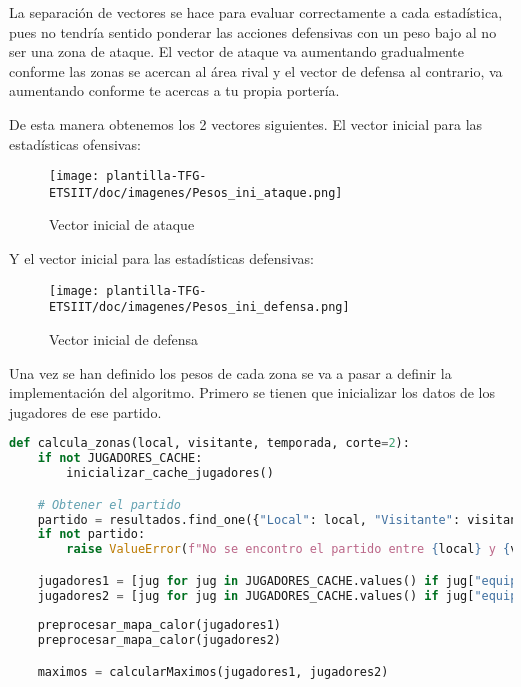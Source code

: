 La separación de vectores se hace para evaluar correctamente a cada estadística, pues no tendría sentido ponderar las acciones defensivas con un peso bajo al no ser una zona de ataque. El vector de ataque va aumentando gradualmente conforme las zonas se acercan al área rival y el vector de defensa al contrario, va aumentando conforme te acercas a tu propia portería.

De esta manera obtenemos los 2 vectores siguientes. El vector inicial para las estadísticas ofensivas:

\begin{figure}[H]
    \centering
    \texttt{[image: plantilla-TFG-ETSIIT/doc/imagenes/Pesos\_ini\_ataque.png]}
    \caption{Vector inicial de ataque}
    \label{fig:etiqueta-imagen}
\end{figure}

Y el vector inicial para las estadísticas defensivas:

\begin{figure}[H]
    \centering
    \texttt{[image: plantilla-TFG-ETSIIT/doc/imagenes/Pesos\_ini\_defensa.png]}
    \caption{Vector inicial de defensa}
    \label{fig:etiqueta-imagen}
\end{figure}

Una vez se han definido los pesos de cada zona se va a pasar a definir la implementación del algoritmo. Primero se tienen que inicializar los datos de los jugadores de ese partido.

\begin{lstlisting}[language=Python, caption={Inicialización datos}, label={lst:codigo-python}]
def calcula_zonas(local, visitante, temporada, corte=2):
    if not JUGADORES_CACHE:
        inicializar_cache_jugadores()

    # Obtener el partido
    partido = resultados.find_one({"Local": local, "Visitante": visitante, "Temporada": temporada})
    if not partido:
        raise ValueError(f"No se encontro el partido entre {local} y {visitante} en la temporada {temporada}.")

    jugadores1 = [jug for jug in JUGADORES_CACHE.values() if jug["equipo"] == local and jug["rival"] == visitante and jug["temporada"] == temporada]
    jugadores2 = [jug for jug in JUGADORES_CACHE.values() if jug["equipo"] == visitante and jug["rival"] == local and jug["temporada"] == temporada]
    
    preprocesar_mapa_calor(jugadores1)
    preprocesar_mapa_calor(jugadores2)

    maximos = calcularMaximos(jugadores1, jugadores2)

\end{lstlisting}

